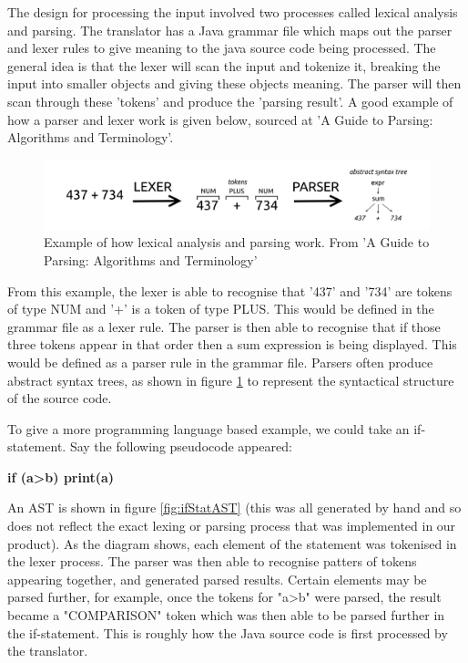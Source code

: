\documentclass{l4proj}
\begin{document}
The design for processing the input involved two processes called lexical analysis and parsing. The translator has a Java grammar file which maps out the parser and lexer rules to give meaning to the java source code being processed. The general idea is that the lexer will scan the input and tokenize it, breaking the input into smaller objects and giving these objects meaning. The parser will then scan through these 'tokens' and produce the 'parsing result'. A good example of how a parser and lexer work is given below, sourced at 'A Guide to Parsing: Algorithms and Terminology'.

\begin{figure}[htb]
    \centering
    \includegraphics[width=1\linewidth]{images/parserLexer.png}
        \caption{Example of how lexical analysis and parsing work. From 'A Guide to Parsing: Algorithms and Terminology'
    }
    \label{fig:parserLexer} 
\end{figure}

From this example, the lexer is able to recognise that '437' and '734' are tokens of type NUM and '+' is a token of type PLUS. This would be defined in the grammar file as a lexer rule.
The parser is then able to recognise that if those three tokens appear in that order then a sum expression is being displayed. This would be defined as a parser rule in the grammar file.
Parsers often produce abstract syntax trees, as shown in figure \ref{fig:parserLexer} to represent the syntactical structure of the source code.

To give a more programming language based example, we could take an if-statement. Say the following pseudocode appeared:

\textbf{if (a>b)
    print(a)}

An AST is shown in figure \ref{fig:ifStatAST} (this was all generated by hand and so does not reflect the exact lexing or parsing process that was implemented in our product). As the diagram shows, each element of the statement was tokenised in the lexer process. The parser was then able to recognise patters of tokens appearing together, and generated parsed results. Certain elements may be parsed further, for example, once the tokens for "a>b" were parsed, the result became a "COMPARISON" token which was then able to be parsed further in the if-statement. 
This is roughly how the Java source code is first processed by the translator.
\end{document}
